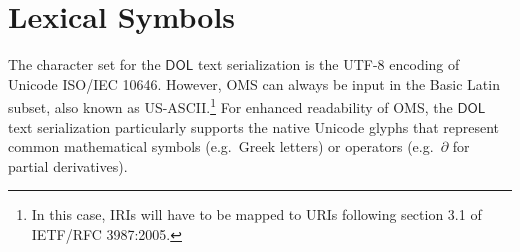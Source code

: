 \documentclass[10pt,fleqn,final]{scrreprt}
\makeatletter
\newcommand*\CommentAuthor{}
\renewcommand*\CommentAuthor{#1}}
\newcommand*\CommentDate{}
\renewcommand*\CommentDate{#1}}
\newcommand*\CommentId{}
\renewcommand*\CommentId{#1}}
\newcommand*\CommentType{}
\renewcommand*\CommentType{#1}}
\newcommand*{\SetCommentColorByType}[1]{%
\edef\localType{{#1}}%
\expandafter\ifstrequal\localType{q-aut}{\colorlet{CommentColor}{red}}{%
\expandafter\ifstrequal\localType{q-all}{\colorlet{CommentColor}{orange}}{%
\expandafter\ifstrequal\localType{todo}{\colorlet{CommentColor}{orange}}{%
\expandafter\ifstrequal\localType{fyi}{\colorlet{CommentColor}{lightgray}}{%
\colorlet{CommentColor}{yellow}}}}}}
\newcommand*{\SetCommentPrefixByType}[1]{%
\edef\localType{{#1}}%
\expandafter\@ifmtarg\localType{%
\edef\CommentPrefix{}%
}{%
\caseupper[q]{#1}%
\edef\CommentPrefix{\thestring: }%
}}
\newcommand*{\initComment}[1]{%
\setkeys{Comment}{#1}%
\SetCommentColorByType{\CommentType}%
\relax%
\SetCommentPrefixByType{\CommentType}%
\relax%
}
\newcommand*{\todonote}[2][]{%
\initComment{#1}%
\pdfcomment[author=\CommentAuthor,color=CommentColor,date=\CommentDate,id=\CommentId]{%
\CommentPrefix
#2}}
\renewcommand*{\todonote}[2][]{%
\initComment{#1}%
\ednote{\CommentPrefix #2}}
\newcommand*{\syntax}[1]{\texttt{#1}}
\newcommand*{\notallowed}{\textbf{not allowed}\xspace}
\newcommand*{\DOL}{\ensuremath{\mathsf{DOL}}\xspace}
\newcommand{\sclause}[1]{\section{#1}}
\newcommand{\nisref}[1]{#1}
\newenvironment{definitions}[0]{\medskip }{}
\makeatother
\begin{document}
\begin{definitions}
%
%
%
%
%

\sclause{Lexical Symbols}

The character set for the \DOL text serialization is the UTF-8 encoding of Unicode \nisref{ISO/IEC 10646}.  However, OMS can always be input in the Basic Latin subset, also known as US-ASCII.\footnote{In this case, IRIs will have to be mapped to URIs following section 3.1 of \nisref{IETF/RFC 3987:2005}.}  For enhanced readability of OMS, the \DOL text serialization particularly supports the native Unicode glyphs that represent common mathematical symbols (e.g.\ Greek letters)  or operators (e.g.\ $\partial$ for partial derivatives). %


\end{definitions}
\end{document}
